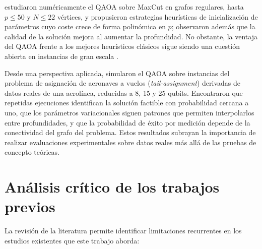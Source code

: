 \cite{zhou2020} estudiaron numéricamente el QAOA sobre MaxCut en grafos regulares, hasta $p\leq 50$ y $N\leq 22$ vértices, y propusieron estrategias heurísticas de inicialización de parámetros cuyo coste crece de forma polinómica en $p$; observaron además que la calidad de la solución mejora al aumentar la profundidad. No obstante, la ventaja del QAOA frente a los mejores heurísticos clásicos sigue siendo una cuestión abierta en instancias de gran escala \citep{lubinski2024}.

Desde una perspectiva aplicada, \cite{vikstaal2020} simularon el QAOA sobre instancias del problema de asignación de aeronaves a vuelos (\textit{tail-assignment}) derivadas de datos reales de una aerolínea, reducidas a 8, 15 y 25 qubits. Encontraron que repetidas ejecuciones identifican la solución factible con probabilidad cercana a uno, que los parámetros variacionales siguen patrones que permiten interpolarlos entre profundidades, y que la probabilidad de éxito por medición depende de la conectividad del grafo del problema. Estos resultados subrayan la importancia de realizar evaluaciones experimentales sobre datos reales más allá de las pruebas de concepto teóricas.

\section{Análisis crítico de los trabajos previos}

La revisión de la literatura permite identificar limitaciones recurrentes en los estudios existentes que este trabajo aborda:

